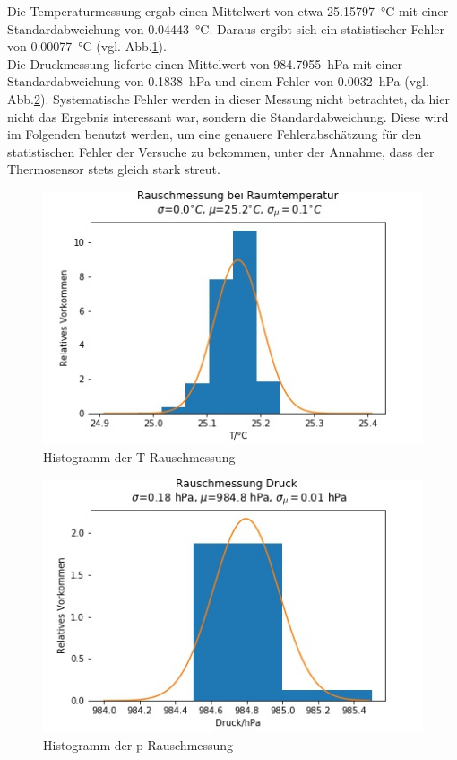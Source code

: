 \documentclass[]{article}
\begin{document}
	Die Temperaturmessung ergab einen Mittelwert von etwa \SI{25.15797}{\celsius} mit einer Standardabweichung von \SI{0.04443}{\celsius}.  Daraus ergibt sich ein statistischer Fehler von \SI{0.00077}{\celsius} (vgl. Abb.\ref{RM_T_histo}).\\
	Die Druckmessung lieferte einen Mittelwert von \SI{984.7955}{\hecto \pascal} mit einer Standardabweichung von \SI{0.1838}{\hecto \pascal} und einem Fehler von \SI{0.0032}{\hecto \pascal} (vgl. Abb.\ref{RM_p_histo}).
	Systematische Fehler werden in dieser Messung nicht betrachtet, da hier nicht das Ergebnis interessant war, sondern die Standardabweichung. Diese wird im Folgenden benutzt werden, um eine genauere Fehlerabschätzung für den statistischen Fehler der Versuche zu bekommen, unter der Annahme, dass der Thermosensor stets gleich stark streut.
	\begin{figure}
		\begin{center}
			\includegraphics[scale=0.9]{Images/RauschmessungRT_T_histo.jpg}
			\caption{Histogramm der T-Rauschmessung}
			\label{RM_T_histo}
		\end{center}
	\end{figure}
	\begin{figure}
		\begin{center}
			\includegraphics[scale=0.9]{Images/RauschmessungRT_p_histo.jpg}
			\caption{Histogramm der p-Rauschmessung}
			\label{RM_p_histo}
		\end{center}
	\end{figure}
	
\end{document}
